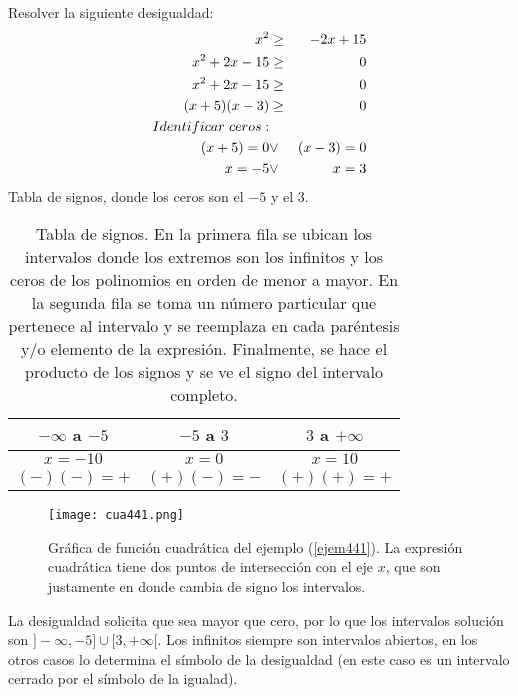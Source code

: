 \begin{myexample}
\label{ejem441}
Resolver la siguiente desigualdad:\\
\begin{eqnarray*}
x^{2}&\geq & -2x+15 \\
x^{2}+2x-15&\geq & 0\\
x^{2}+2x-15&\geq & 0\\
(x+5)(x-3)&\geq & 0\\
Identificar\hspace{3px} ceros: \\
(x+5)=0 &\vee & (x-3)=0\\
x=-5 &\vee & x=3 \\
\end{eqnarray*}
Tabla de signos, donde los ceros son el $-5$ y el $3$.

\begin{center}
	\begin{table}[h!]
	\centering
		\begin{tabular}{|c|c|c|}
\hline
$-\infty$ a $-5$ &$-5$ a $3$ &$3$ a $+\infty$ \\
\hline
$x=-10$ & $x=0$ & $x=10$\\
$(-)(-)=+$ & $(+)(-)=-$ & $(+)(+)=+$ \\
\hline
		\end{tabular}
		\caption[Tabla de signos.]{Tabla de signos. En la primera fila se ubican los intervalos donde los extremos son los infinitos y los ceros de los polinomios en orden de menor a mayor. En la segunda fila se toma un número particular que pertenece al intervalo y se reemplaza en cada paréntesis y/o elemento de la expresión. Finalmente, se hace el producto de los signos y se ve el signo del intervalo completo.}
	\end{table}
\end{center}

\begin{center}
\begin{figure}[h!]
\texttt{[image: cua441.png]}
\caption[Gráfica de función cuadrática del ejemplo (\ref{ejem441}).]{Gráfica de función cuadrática del ejemplo (\ref{ejem441}). La expresión cuadrática tiene dos puntos de intersección con el eje $x$, que son justamente en donde cambia de signo los intervalos. }
\end{figure}
\end{center}
La desigualdad solicita que sea mayor que cero, por lo que los intervalos solución son $]-\infty,-5]\cup [3,+\infty[$. Los infinitos siempre son intervalos abiertos, en los otros casos lo determina el símbolo de la desigualdad (en este caso es un intervalo cerrado por el símbolo de la igualad).
\end{myexample}

